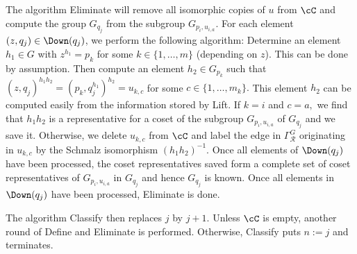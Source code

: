 The algorithm {\sc Eliminate} will remove all isomorphic copies 
of $u$ from $\cC$ and compute the group $G_{q_j}$ from the subgroup $G_{p_i,u_{i,a}}.$ 
For each element $(z,q_j) \in  \Down(q_j)$, we perform the following algorithm:
Determine an element $h_1 \in G$ with $z^{h_1} = p_k$ 
for some $k\in\{1,\ldots,m\}$ (depending on $z$). This can be done by assumption. 
Then compute an element $h_2 \in G_{p_k}$ such that $(z,q_j)^{h_1h_2}=(p_k,q_j^{h_1})^{h_2} = u_{k,c}$ 
for some $c \in \{1,\ldots,m_k\}.$ 
This element $h_2$ can be computed easily from the information stored by {\sc Lift}. 
If $k=i$ and $c=a,$ we find that $h_1h_2$ is a  representative 
for a coset of the subgroup $G_{p_i,u_{i,a}}$ of $G_{q_j}$ 
and we save it. 
Otherwise, we delete $u_{k,c}$ from $\cC$ and label the edge in 
$\Gamma_{\mathcal R}^G$
originating in $u_{k,c}$ by the Schmalz isomorphism $(h_1h_2)^{-1}.$
Once all elements of $\Down(q_j)$ have been processed, 
the coset representatives saved form a complete set of coset representatives 
of $G_{p_i,u_{i,a}}$ in $G_{q_j}$ and hence $G_{q_j}$ is known. 
Once all elements in $\Down(q_j)$ have been processed, 
{\sc Eliminate} is done. 

\bigskip

The algorithm {\sc Classify} then replaces $j$ by $j+1.$ Unless $\cC$ is empty, 
another round of {\sc Define} and {\sc Eliminate} is performed. 
Otherwise, {\sc Classify} puts $n:=j$ 
and terminates.


